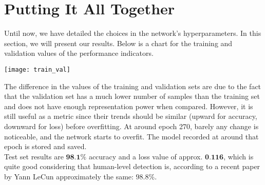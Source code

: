 \section{Putting It All Together}
Until now, we have detailed the choices in the network's hyperparameters. In this section, we will present our results. Below is a chart for the training and validation values of the performance indicators.
\begin{center}
\texttt{[image: train\_val]}
\end{center}
The difference in the values of the training and validation sets are due to the fact that the validation set has a much lower number of samples than the training set and does not have enough representation power when compared. However, it is still useful as a metric since their trends should be similar (upward for accuracy, downward for loss) before overfitting. At around epoch 270, barely any change is noticeable, and the network starts to overfit. The model recorded at around that epoch is stored and saved.\\
Test set results are $\textbf{98.1\%}$ accuracy and a loss value of approx. $\textbf{0.116}$, which is quite good considering that human-level detection is, according to a recent paper by Yann LeCun\cite{lecunDetection} approximately the same: $98.8\%$.
